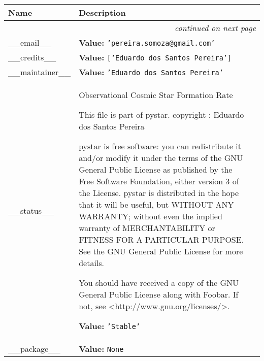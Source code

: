     \vspace{-1cm}
\hspace{\varindent}\begin{longtable}{|p{\varnamewidth}|p{\vardescrwidth}|l}
\cline{1-2}
\cline{1-2} \centering \textbf{Name} & \centering \textbf{Description}& \\
\cline{1-2}
\endhead\cline{1-2}\multicolumn{3}{r}{\small\textit{continued on next page}}\\\endfoot\cline{1-2}
\endlastfoot\raggedright \_\-\_\-e\-m\-a\-i\-l\-\_\-\_\- & \raggedright \textbf{Value:} 
{\tt \texttt{'}\texttt{pereira.somoza@gmail.com}\texttt{'}}&\\
\cline{1-2}
\raggedright \_\-\_\-c\-r\-e\-d\-i\-t\-s\-\_\-\_\- & \raggedright \textbf{Value:} 
{\tt \texttt{[}\texttt{'}\texttt{Eduardo dos Santos Pereira}\texttt{'}\texttt{]}}&\\
\cline{1-2}
\raggedright \_\-\_\-m\-a\-i\-n\-t\-a\-i\-n\-e\-r\-\_\-\_\- & \raggedright \textbf{Value:} 
{\tt \texttt{'}\texttt{Eduardo dos Santos Pereira}\texttt{'}}&\\
\cline{1-2}
\raggedright \_\-\_\-s\-t\-a\-t\-u\-s\-\_\-\_\- & \raggedright Observational Cosmic Star Formation Rate

          This file is part of pystar. copyright : Eduardo dos Santos 
          Pereira

          pystar is free software: you can redistribute it and/or modify it
          under the terms of the GNU General Public License as published by
          the Free Software Foundation, either version 3 of the License. 
          pystar is distributed in the hope that it will be useful, but 
          WITHOUT ANY WARRANTY; without even the implied warranty of 
          MERCHANTABILITY or FITNESS FOR A PARTICULAR PURPOSE.  See the GNU
          General Public License for more details.

          You should have received a copy of the GNU General Public License
          along with Foobar.  If not, see 
          {\textless}http://www.gnu.org/licenses/{\textgreater}.

\textbf{Value:} 
{\tt \texttt{'}\texttt{Stable}\texttt{'}}&\\
\cline{1-2}
\raggedright \_\-\_\-p\-a\-c\-k\-a\-g\-e\-\_\-\_\- & \raggedright \textbf{Value:} 
{\tt None}&\\
\cline{1-2}
\end{longtable}



